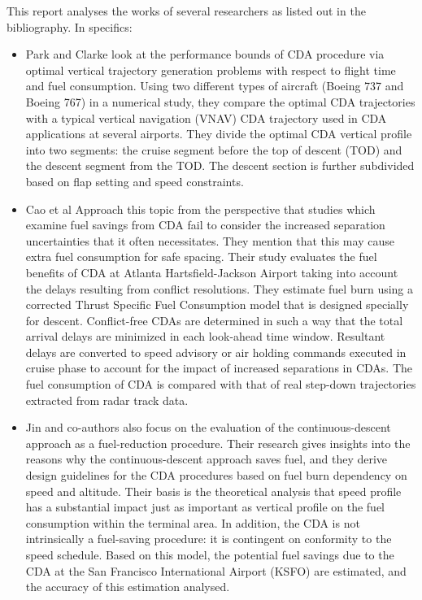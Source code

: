 \documentclass{aer1315-pretty}
\begin{document}
This report analyses the works of several researchers as listed out in the bibliography. In specifics:
\begin{itemize}
\item Park and Clarke \cite{Park:2015} look at the performance bounds of CDA procedure via optimal vertical trajectory generation problems with respect to flight time and fuel consumption. Using two different types of aircraft (Boeing 737 and Boeing 767) in a numerical study, they compare the optimal CDA trajectories with a typical vertical navigation (VNAV) CDA trajectory used in CDA applications at several airports. They divide the optimal CDA vertical profile into two segments: the cruise segment before the top of descent (TOD) and the descent segment from the TOD. The descent section is further subdivided based on flap setting and speed constraints. 

\item Cao et al \cite{Cao:2013} Approach this topic from the perspective that studies which examine fuel savings from CDA
fail to consider the increased separation uncertainties that it often necessitates. They mention that this may cause extra
fuel consumption for safe spacing. Their study evaluates the fuel benefits of CDA at Atlanta Hartsfield-Jackson Airport taking into account the delays resulting from conflict resolutions. They estimate fuel burn using a corrected Thrust Specific Fuel Consumption model that is designed specially for descent. Conflict-free CDAs are determined in such a way that the total arrival
delays are minimized in each look-ahead time window. Resultant delays are converted to speed advisory or air holding commands executed in cruise phase to account for the impact of increased separations in CDAs. The fuel consumption of CDA is compared with that of real step-down trajectories extracted from radar track data. 


\item Jin and co-authors \cite{Jin:2013} also focus on the evaluation of the continuous-descent approach as a fuel-reduction procedure. Their research gives insights into the reasons why the continuous-descent approach saves fuel, and they derive design guidelines for the CDA procedures based on fuel burn dependency on speed and altitude. Their basis is the theoretical analysis that speed profile has a substantial impact just as important as vertical profile on the fuel consumption within the terminal area. In addition, the CDA is not intrinsically a fuel-saving procedure: it is contingent on conformity to the speed schedule. Based on this model, the potential fuel savings due to the CDA at the San Francisco International Airport (KSFO) are estimated, and the accuracy of this estimation analysed.


\end{itemize}
\end{document}
